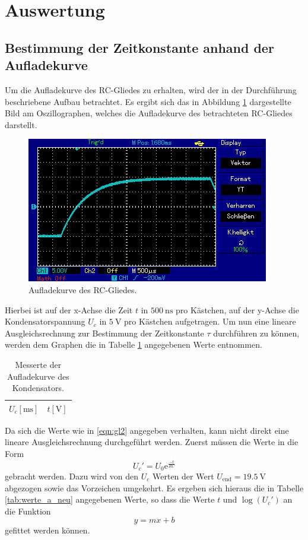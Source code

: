 \section{Auswertung}
\label{sec:Auswertung}
\subsection{Bestimmung der Zeitkonstante anhand der Aufladekurve}
Um die Aufladekurve des RC-Gliedes zu erhalten, wird der in der Durchführung beschriebene Aufbau betrachtet.
Es ergibt sich das in Abbildung \ref{fig:oz1} dargestellte Bild am Oszillographen, welches die Aufladekurve des betrachteten RC-Gliedes darstellt.

\begin{figure}[H]
  \centering
  \includegraphics{oz4.png}
  \caption{Aufladekurve des RC-Gliedes.}
  \label{fig:oz1}
\end{figure}

Hierbei ist auf der x-Achse die Zeit $t$ in $\SI{500}{\nano\second}$ pro Kästchen, auf der y-Achse die Kondensatorspannung $U_c$ in $\SI{5}{\volt}$ pro Kästchen aufgetragen.
Um nun eine lineare Ausgleichsrechnung zur Bestimmung der Zeitkonstante $\tau$ durchführen zu können, werden dem Graphen die in Tabelle \ref{tab:werte_a} angegebenen Werte entnommen.


\begin{table}[H]
  \centering
  \caption{Messerte der Aufladekurve des Kondensators.}
  \label{tab:werte_a}
  \begin{tabular}{c c}
    \toprule
    {$U_c [\si{\milli\second}]$} & {$t [\si{\volt}]$}\\
    \midrule
    
    \bottomrule
  \end{tabular}
\end{table}

Da sich die Werte wie in \eqref{eqn:gl2} angegeben verhalten, kann nicht direkt eine lineare Ausgleichsrechnung durchgeführt werden.
Zuerst müssen die Werte in die Form
\begin{equation}
  U_c' = U_0 \mathrm{e}^{\frac{-t}{RC}}
\end{equation}
gebracht werden.
Dazu wird von den $U_c$ Werten der Wert $U_{\text{end}} = \SI{19.5}{\volt}$ abgezogen sowie das Vorzeichen umgekehrt.
Es ergeben sich hieraus die in Tabelle \ref{tab:werte_a_neu} angegebenen Werte, so dass die Werte $t$ und $\log(U_c')$ an die Funktion
\begin{equation}
  y = m x +b
\end{equation}
gefittet werden können.

